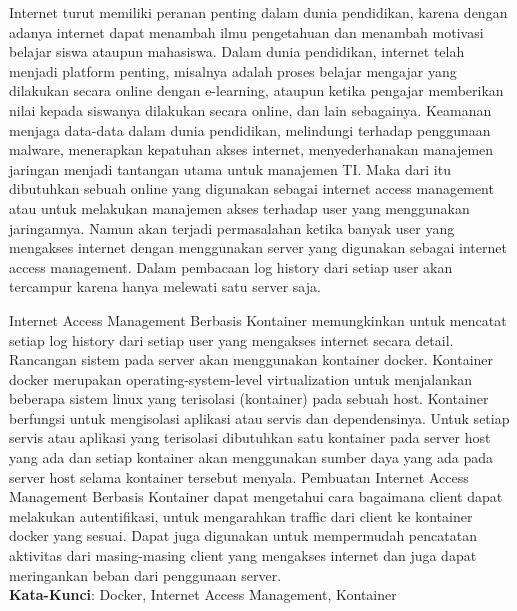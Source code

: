 \begin{abstrak}
Internet turut memiliki peranan penting dalam dunia pendidikan, karena dengan adanya internet dapat menambah ilmu pengetahuan dan menambah motivasi belajar siswa ataupun mahasiswa. Dalam dunia pendidikan, internet telah menjadi platform penting, misalnya adalah proses belajar mengajar yang dilakukan secara online dengan e-learning, ataupun ketika pengajar memberikan nilai kepada siswanya dilakukan secara online, dan lain sebagainya. Keamanan menjaga data-data dalam dunia pendidikan, melindungi terhadap penggunaan malware, menerapkan kepatuhan akses internet, menyederhanakan manajemen jaringan menjadi tantangan utama untuk manajemen TI. Maka dari itu dibutuhkan sebuah online yang digunakan sebagai internet access management atau untuk melakukan manajemen akses terhadap user yang menggunakan jaringannya. Namun akan terjadi permasalahan ketika banyak user yang mengakses internet dengan menggunakan server yang digunakan sebagai internet access management. Dalam pembacaan log history dari setiap user akan tercampur karena hanya melewati satu server saja.

Internet Access Management Berbasis Kontainer  memungkinkan untuk mencatat setiap log history dari setiap user yang mengakses internet secara detail. Rancangan sistem pada server akan menggunakan kontainer docker. Kontainer docker merupakan operating-system-level virtualization untuk menjalankan beberapa sistem linux yang terisolasi (kontainer) pada sebuah host. Kontainer berfungsi untuk mengisolasi aplikasi atau servis dan dependensinya. Untuk setiap servis atau aplikasi yang terisolasi dibutuhkan satu kontainer pada server host yang ada dan setiap kontainer akan menggunakan sumber daya yang ada pada server host selama kontainer tersebut menyala. Pembuatan Internet Access Management Berbasis Kontainer dapat mengetahui cara bagaimana client dapat melakukan autentifikasi, untuk mengarahkan traffic dari client ke kontainer docker yang sesuai. Dapat juga digunakan untuk mempermudah pencatatan aktivitas dari masing-masing client yang mengakses internet dan juga dapat meringankan beban dari penggunaan server.\\

	\noindent \textbf{Kata-Kunci}: Docker, Internet Access Management, Kontainer
\end{abstrak}
\newpage
